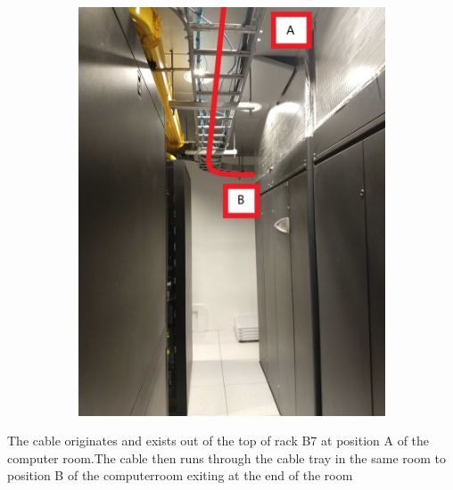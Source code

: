 \begin{figure}
\begin{subfigure}{0.40\textwidth}
      \includegraphics[width=\textwidth]{images/12.jpg}
    \end{subfigure}
  \end{figure}
  The cable originates and exists out of the top of rack B7 at position A of the computer room.The cable then runs through the cable tray in the same room to position B of the computerroom exiting at the end of the room
  
\newpage

